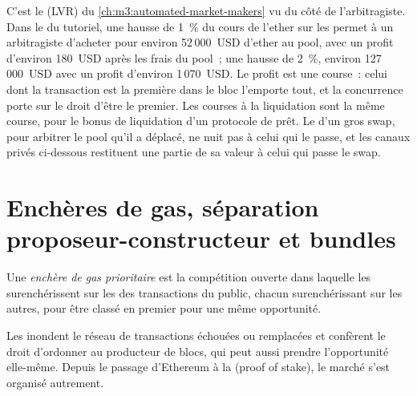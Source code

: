 C'est le  (LVR) du \cref{ch:m3:automated-market-makers} vu du côté de l'arbitragiste. Dans le  du tutoriel, une hausse de 1~\%
du cours de l'ether sur les  permet à un arbitragiste d'acheter pour environ 52\,000~USD d'ether au pool, avec un profit d'environ 180~USD
après les frais du pool~; une hausse de 2~\%, environ 127\,000~USD avec un profit d'environ 1\,070~USD. Le profit est une course~: celui dont la transaction est la première
dans le bloc l'emporte tout, et la concurrence porte sur le droit d'être le premier. Les courses à la liquidation sont la même course, pour le bonus de liquidation d'un protocole de prêt.
Le  d'un gros swap, pour arbitrer le pool qu'il a déplacé, ne nuit pas à celui qui le passe, et les canaux privés ci-dessous
restituent une partie de sa valeur à celui qui passe le swap.

\section{Enchères de gas, séparation proposeur-constructeur et bundles}

\begin{definition}\label{def:m3:maximal-extractable-value:pga}
Une \emph{enchère de gas prioritaire} est la compétition ouverte dans laquelle les  surenchérissent sur les  des transactions du
 public, chacun surenchérissant sur les autres, pour être classé en premier pour une même opportunité.
\end{definition}

Les  inondent le réseau de transactions échouées ou remplacées et confèrent le droit d'ordonner au producteur de blocs, qui peut aussi prendre
l'opportunité elle-même. Depuis le passage d'Ethereum à la  (proof of stake), le marché s'est organisé autrement.

